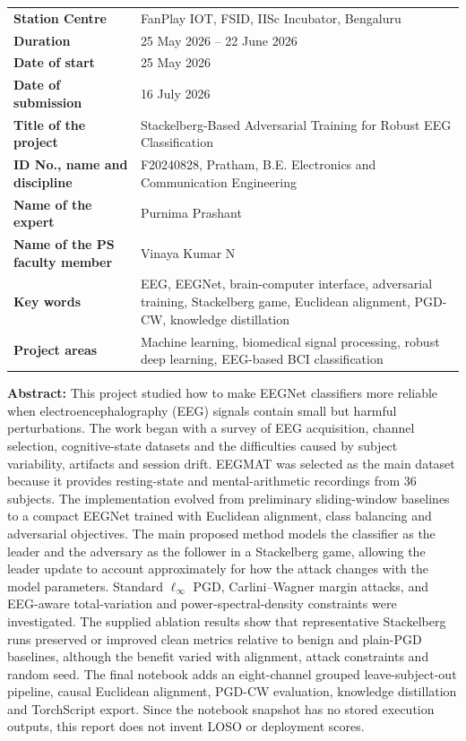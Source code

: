 \documentclass[10pt,a4paper,openright]{report}
\newcommand{\projecttitle}{Stackelberg-Based Adversarial Training for Robust EEG Classification}
\begin{document}
\small
\renewcommand{\arraystretch}{1.17}
\begin{tabularx}{\textwidth}{>{\bfseries}p{} X}
Station Centre & FanPlay IOT, FSID, IISc Incubator, Bengaluru \\
Duration & 25 May 2026 -- 22 June 2026 \\
Date of start & 25 May 2026 \\
Date of submission & 16 July 2026 \\
Title of the project & \projecttitle \\
ID No., name and discipline & F20240828, Pratham, B.E. Electronics and Communication Engineering \\
Name of the expert & Purnima Prashant \\
Name of the PS faculty member & Vinaya Kumar N \\
Key words & EEG, EEGNet, brain-computer interface, adversarial training, Stackelberg game, Euclidean alignment, PGD-CW, knowledge distillation \\
Project areas & Machine learning, biomedical signal processing, robust deep learning, EEG-based BCI classification \\
\end{tabularx}

\vspace{0.12cm}
\textbf{Abstract:}
This project studied how to make EEGNet classifiers more reliable when electroencephalography (EEG) signals contain small but harmful perturbations. The work began with a survey of EEG acquisition, channel selection, cognitive-state datasets and the difficulties caused by subject variability, artifacts and session drift. EEGMAT was selected as the main dataset because it provides resting-state and mental-arithmetic recordings from 36 subjects. The implementation evolved from preliminary sliding-window baselines to a compact EEGNet trained with Euclidean alignment, class balancing and adversarial objectives. The main proposed method models the classifier as the leader and the adversary as the follower in a Stackelberg game, allowing the leader update to account approximately for how the attack changes with the model parameters. Standard $\ell_\infty$ PGD, Carlini--Wagner margin attacks, and EEG-aware total-variation and power-spectral-density constraints were investigated. The supplied ablation results show that representative Stackelberg runs preserved or improved clean metrics relative to benign and plain-PGD baselines, although the benefit varied with alignment, attack constraints and random seed. The final notebook adds an eight-channel grouped leave-subject-out pipeline, causal Euclidean alignment, PGD-CW evaluation, knowledge distillation and TorchScript export. Since the notebook snapshot has no stored execution outputs, this report does not invent LOSO or deployment scores.
\end{document}
